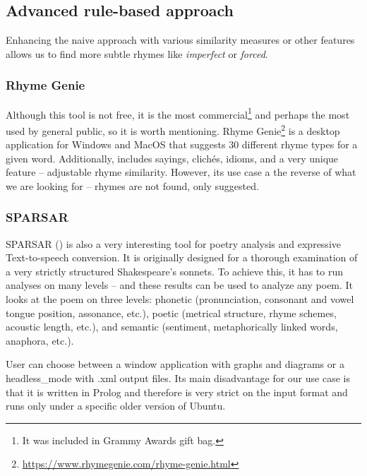 \subsection{Advanced rule-based approach}
Enhancing the naive approach with various similarity measures or other features allows us to find more subtle rhymes like \textit{imperfect} or \textit{forced}.

\subsubsection*{Rhyme Genie}
Although this tool is not free, it is the most commercial\footnote{It was included in Grammy Awards gift bag.}
and perhaps the most used by general public, so it is worth mentioning. Rhyme Genie\footnote{\url{https://www.rhymegenie.com/rhyme-genie.html}} is a desktop application for Windows and MacOS that suggests 30 different rhyme types for a given word. Additionally,  includes sayings, clichés, idioms, and a very unique feature -- adjustable rhyme similarity. However, its use case a the
reverse of what we are looking for -- rhymes are not found, only suggested.

\subsubsection*{SPARSAR}
SPARSAR (\cite{Delmonte2014}) is also a very interesting tool for poetry analysis and expressive Text-to-speech conversion. It is originally designed for a thorough examination of a very strictly structured Shakespeare's sonnets. To achieve this, it has to run analyses on many levels -- and these results can be used to analyze any poem. It looks at the poem on three levels: phonetic (pronunciation, consonant and vowel tongue position, assonance, etc.), poetic (metrical structure, rhyme schemes, acoustic length, etc.), and semantic (sentiment, metaphorically linked words, anaphora, etc.).

User can choose between a window application with graphs and diagrams or a \gls{headless_mode} with .xml output files. Its main disadvantage for our use case is that it is written in Prolog and therefore is very strict on the input format and runs only under a specific older version of Ubuntu. 

